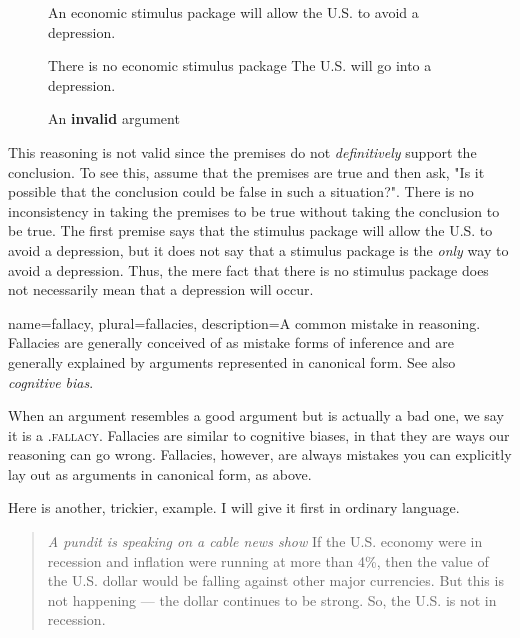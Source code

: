 \begin{figure}[b]
\begin{mdframed}[style=mytablebox]
\begin{earg*}
\item An economic stimulus package will allow the U.S. to avoid a depression. 
\item There is no economic stimulus package
\itemc[.3] The U.S. will go into a depression. 
\end{earg*}
\end{mdframed}
\caption{An \textbf{invalid} argument} \label{fig:invalid_stimulus}
\end{figure}


This reasoning is not valid since the premises do not \textit{definitively} support the conclusion. To see this, assume that the premises are true and then ask, "Is it possible that the conclusion could be false in such a situation?". There is no inconsistency in taking the premises to be true without taking the conclusion to be true. The first premise says that the stimulus package will allow the U.S. to avoid a depression, but it does not say that a stimulus package is the \textit{only }way to avoid a depression. Thus, the mere fact that there is no stimulus package does not necessarily mean that a depression will occur. 

{
name=fallacy,
plural=fallacies,
description={A common mistake in reasoning. Fallacies are generally conceived of as mistake forms of inference and are generally explained by arguments represented in canonical form. See also \emph{cognitive bias}.}
}

When an argument resembles a good argument but is actually a bad one, we say it is a .\textsc{\gls{fallacy}}\label{def:fallacy}. Fallacies are similar to cognitive biases, in that they are ways our reasoning can go wrong.  Fallacies, however, are always mistakes you can explicitly lay out as arguments in canonical form, as above. 

Here is another, trickier, example. I will give it first in ordinary language. 

\begin{quotation} \noindent\textit{A pundit is speaking on a cable news show} If the U.S. economy were in recession and inflation were running at more than 4\%, then the value of the U.S. dollar would be falling against other major currencies. But this is not happening --- the dollar continues to be strong. So, the U.S. is not in recession. \end{quotation}

